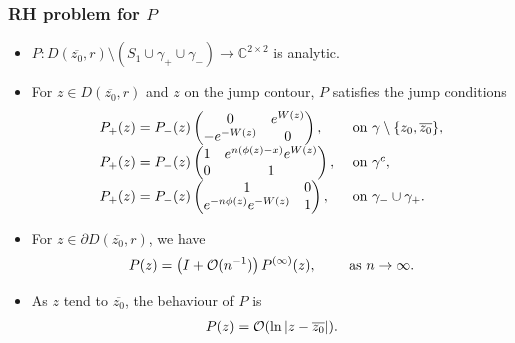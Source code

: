 \documentclass[11pt,fleqn]{article}
\numberwithin{equation}{section}
\def\bigO{{\cal O}}
\begin{document}
\subsubsection*{RH problem for $P$}

\begin{itemize}
\item[(a)] $P : D(\overline{z_{0}},r) \setminus (S_{1} \cup \gamma_{+} \cup \gamma_{-}) \to \mathbb{C}^{2\times 2}$ is analytic.
\item[(b)] For $z\in D(\overline{z_{0}},r)$ and $z$ on the jump contour, $P$ satisfies the jump conditions
\begin{equation*}
\begin{array}{l l}
P_{+}(z) = P_{-}(z) \begin{pmatrix}
0 & e^{W(z)} \\ -e^{-W(z)} & 0
\end{pmatrix}, & \mbox{ on } \gamma\setminus\{z_{0},\overline{z_{0}}\}, \\

P_{+}(z) = P_{-}(z) \begin{pmatrix}
 1 & e^{n(\phi(z)-x)}e^{W(z)} \\
 0 & 1
\end{pmatrix}, & \mbox{ on } \gamma^{c}, \\

P_{+}(z) = P_{-}(z) \begin{pmatrix}
 1 & 0  \\ e^{-n\phi(z)}e^{-W(z)} & 1
\end{pmatrix}, & \mbox{ on } \gamma_{-} \cup \gamma_{+}. \\
\end{array}
\end{equation*}
\item[(c)] For $ z \in \partial D (\overline{z_{0}},r)$, we have
\begin{equation}\label{matching P z0bar} P(z) = \left(I + \bigO(n^{-1})\right) P^{(\infty)}(z),\qquad\mbox{ as $n \to \infty$.}
\end{equation}
\item[(d)] As $z$ tend to $\overline{z_{0}}$, the behaviour of $P$ is
\begin{equation*}
\begin{array}{l l}
P(z) = \bigO(\ln|z-\overline{z_0}|).
\end{array}
\end{equation*}
\end{itemize}
\end{document}
